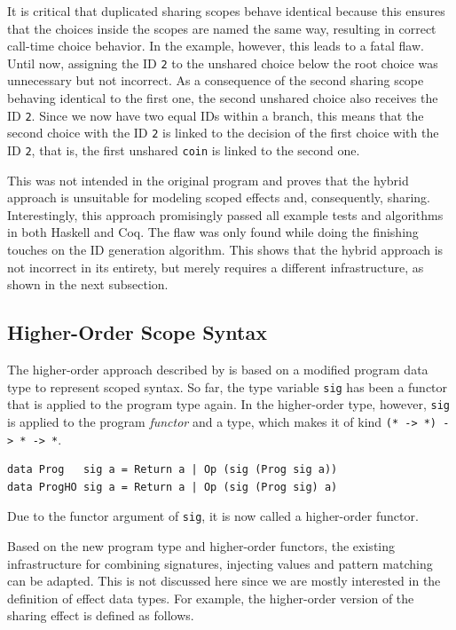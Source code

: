 \documentclass[a4paper, 11pt, fleqn, twoside, abstract=on]{scrreprt}
\newcommand{\hinl}[1]{\texttt{#1}}
\begin{document}
It is critical that duplicated sharing scopes behave identical because this ensures that the choices inside the scopes are named the same way, resulting in correct call-time choice behavior.
In the example, however, this leads to a fatal flaw.
Until now, assigning the ID \hinl{2} to the unshared choice below the root choice was unnecessary but not incorrect.
As a consequence of the second sharing scope behaving identical to the first one, the second unshared choice also receives the ID \hinl{2}.
Since we now have two equal IDs within a branch, this means that the second choice with the ID \hinl{2} is linked to the decision of the first choice with the ID \hinl{2}, that is, the first unshared \hinl{coin} is linked to the second one.

This was not intended in the original program and proves that the hybrid approach is unsuitable for modeling scoped effects and, consequently, sharing.
Interestingly, this approach promisingly passed all example tests and algorithms in both Haskell and Coq.
The flaw was only found while doing the finishing touches on the ID generation algorithm.
This shows that the hybrid approach is not incorrect in its entirety, but merely requires a different infrastructure, as shown in the next subsection.

\subsection{Higher-Order Scope Syntax}
\label{subsec:HOscopesyntax}
The higher-order approach described by \citet{wu2014effect} is based on a modified  program data type to represent scoped syntax.
So far, the type variable \hinl{sig} has been a functor that is applied to the program type again.
In the higher-order type, however, \hinl{sig} is applied to the program \textit{functor} and a type, which makes it of kind \hinl{(* -> *) -> * -> *}.

\begin{verbatim}
data Prog   sig a = Return a | Op (sig (Prog sig a))
data ProgHO sig a = Return a | Op (sig (Prog sig) a)
\end{verbatim}
\noindent
Due to the functor argument of \hinl{sig}, it is now called a higher-order functor.

Based on the new program type and higher-order functors, the existing infrastructure for combining signatures, injecting values and pattern matching can be adapted.
This is not discussed here since we are mostly interested in the definition of effect data types.
For example, the higher-order version of the sharing effect is defined as follows.
\end{document}
